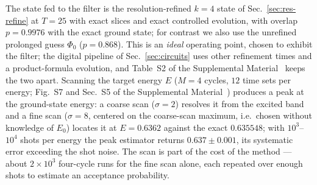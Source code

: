 \documentclass[
  aps,            %
  prc,            %
  reprint,        %
  superscriptaddress,
  floatfix,
  nofootinbib
]{revtex4-2}
\newcommand{\SM}{Supplemental Material~\cite{SM}}
\begin{document}
The state fed to the filter is the resolution-refined $k=4$ state of
Sec.~\ref{sec:res-refine} at $T=25$ with exact slices and exact controlled
evolution, with overlap $p=0.9976$ with the exact ground state; for contrast
we also use the unrefined prolonged guess $\Phi_0$ ($p=0.868$).  This is an
\emph{ideal} operating point, chosen to exhibit the filter; the digital
pipeline of Sec.~\ref{sec:circuits} uses other refinement times and a
product-formula evolution, and Table~S2 of the \SM{} keeps the two apart.
Scanning the target energy $E$ ($M=4$ cycles, $12$ time sets per energy;
Fig.~S7 and Sec.~S5 of the \SM{}) produces a peak at the ground-state
energy: a coarse scan ($\sigma=2$) resolves it from the excited band and a
fine scan ($\sigma=8$, centered on the coarse-scan maximum, i.e.\ chosen
without knowledge of $E_0$) locates it at $E=0.6362$ against the exact
$0.635548$; with $10^{3}$--$10^{4}$ shots per energy the peak estimator
returns $0.637\pm0.001$, its systematic error exceeding the shot noise.  The
scan is part of the cost of the method --- about $2\times10^{3}$ four-cycle
runs for the fine scan alone, each repeated over enough shots to estimate an
acceptance probability.
\end{document}
